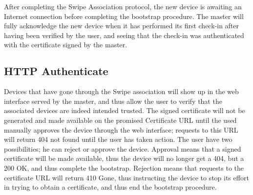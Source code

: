 After completing the Swipe Association protocol, the new device is awaiting an Internet connection before completing the bootstrap procedure. The master will fully acknowledge the new device when it has performed its first check-in after having been verified by the user, and seeing that the check-in was authenticated with the certificate signed by the master.

\subsection{HTTP Authenticate}
Devices that have gone through the Swipe association will show up in the web interface served by the master, and thus allow the user to verify that the associated devices are indeed intended trusted. The signed certificate will not be generated and made available on the promised Certificate URL until the used manually approves the device through the web interface; requests to this URL will return 404 not found until the user has taken action.
The user have two possibilities; he can reject or approve the device. Approval means that a signed certificate will be made available, thus the device will no longer get a 404, but a 200 OK, and thus complete the bootstrap. Rejection means that requests to the certificate URL will return 410 Gone, thus instructing the device to stop its effort in trying to obtain a certificate, and thus end the bootstrap procedure.

